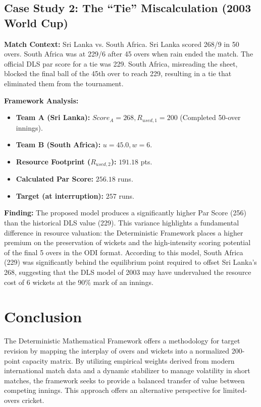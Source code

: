 \documentclass[12pt, letterpaper, fleqn]{article}
\begin{document}
\subsection{Case Study 2: The ``Tie'' Miscalculation (2003 World Cup)}

\indent \textbf{Match Context:} Sri Lanka vs. South Africa. Sri Lanka scored 268/9 in 50 overs. South Africa was at 229/6 after 45 overs when rain ended the match. The official DLS par score for a tie was 229. South Africa, misreading the sheet, blocked the final ball of the 45th over to reach 229, resulting in a tie that eliminated them from the tournament.

\vspace{1em}
\noindent \textbf{Framework Analysis:}
\begin{itemize}
    \item \textbf{Team A (Sri Lanka):} $Score_A = 268, R_{used,1} = 200$ (Completed 50-over innings).
    \item \textbf{Team B (South Africa):} $u = 45.0, w = 6$.
    \item \textbf{Resource Footprint ($R_{used,2}$):} $191.18$ pts.
    \item \textbf{Calculated Par Score:} $256.18$ runs.
    \item \textbf{Target (at interruption):} $257$ runs.
\end{itemize}

\indent \textbf{Finding:} The proposed model produces a significantly higher Par Score (256) than the historical DLS value (229). This variance highlights a fundamental difference in resource valuation: the Deterministic Framework places a higher premium on the preservation of wickets and the high-intensity scoring potential of the final 5 overs in the ODI format. According to this model, South Africa (229) was significantly behind the equilibrium point required to offset Sri Lanka's 268, suggesting that the DLS model of 2003 may have undervalued the resource cost of 6 wickets at the 90\% mark of an innings.

\section{Conclusion}
\indent The Deterministic Mathematical Framework offers a methodology for target revision by mapping the interplay of overs and wickets into a normalized 200-point capacity matrix. By utilizing empirical weights derived from modern international match data and a dynamic stabilizer to manage volatility in short matches, the framework seeks to provide a balanced transfer of value between competing innings. This approach offers an alternative perspective for limited-overs cricket.
\end{document}
